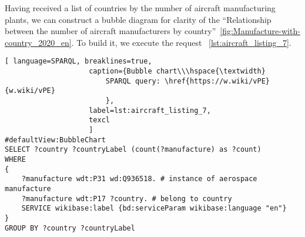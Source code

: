 
Having received a list of countries by the number of aircraft manufacturing plants, we can construct a bubble diagram 
for clarity of the ``Relationship between the number of aircraft manufacturers by country''~\ref{fig:Manufacture-with-country_2020_en}. 
To build it, we execute the request ~\ref{lst:aircraft_listing_7}.

\begin{lstlisting}[ language=SPARQL, breaklines=true, 
                    caption={Bubble chart\\\hspace{\textwidth}
                        SPARQL query: \href{https://w.wiki/vPE}{w.wiki/vPE}
                        },
                    label=lst:aircraft_listing_7,
                    texcl 
                    ]
#defaultView:BubbleChart
SELECT ?country ?countryLabel (count(?manufacture) as ?count)
WHERE
{
    ?manufacture wdt:P31 wd:Q936518. # instance of aerospace manufacture
  	?manufacture wdt:P17 ?country. # belong to country
    SERVICE wikibase:label {bd:serviceParam wikibase:language "en"}
}
GROUP BY ?country ?countryLabel
\end{lstlisting}


